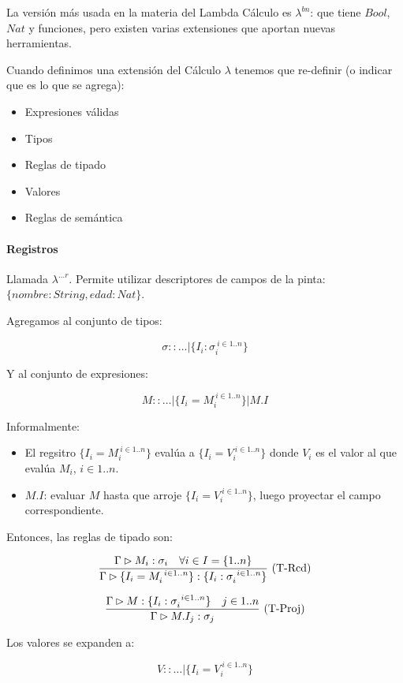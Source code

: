 La versión más usada en la materia del Lambda Cálculo es $\lambda^{bn}$: que tiene $Bool$, $Nat$ y funciones, pero existen varias extensiones que aportan nuevas herramientas.

Cuando definimos una extensión del Cálculo $\lambda$ tenemos que re-definir (o indicar que es lo que se agrega):
\begin{itemize}
  \item Expresiones válidas
  \item Tipos
  \item Reglas de tipado
  \item Valores
  \item Reglas de semántica
\end{itemize}

\paragraph{Registros}

Llamada $\lambda^{\dots r}$. Permite utilizar descriptores de campos de la pinta: $\{nombre: String, edad: Nat\}$.

Agregamos al conjunto de tipos:

\[\sigma :: \dots \vert \{I_i : \sigma_i^{\ i \in 1..n}\}\]

Y al conjunto de expresiones:

\[M :: \dots \vert \{I_i = M_i^{\ i \in 1..n}\} \vert M.I\]

Informalmente:
\begin{itemize}
  \item El regsitro $\{I_i = M_i^{\ i \in 1..n}\}$ evalúa a $\{I_i = V_i^{\ i \in 1..n}\}$ donde $V_i$ es el valor al que evalúa $M_i$, $i \in 1..n$.
  \item $M.I$: evaluar $M$ hasta que arroje $\{I_i = V_i^{\ i \in 1..n}\}$, luego proyectar el campo correspondiente.
\end{itemize}

Entonces, las reglas de tipado son:

\[\frac{\Gamma \rhd M_i : \sigma_i\quad \forall i \in I = \{1..n\}}{\Gamma \rhd \{I_i = M_i^{\ i \in 1..n}\}:\{I_i : \sigma_i^{\ i \in 1..n}\}}\ \text{(T-Rcd)}\]

\[\frac{\Gamma \rhd M : \{I_i : \sigma_{i}^{\ i \in 1..n}\}\quad j\in 1..n}{\Gamma \rhd M.I_j : \sigma_j}\ \text{(T-Proj)}\]

Los valores se expanden a:

\[V :: \dots \vert \{I_i = V_i^{\ i \in 1..n}\}\]

